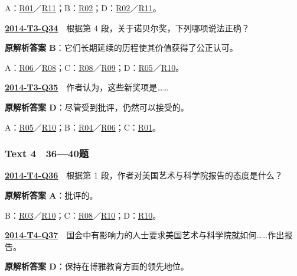 \documentclass[11pt,a4paper]{article}
\begin{document}
\noindent A：\hyperref[cat-R01]{R01}／\hyperref[cat-R11]{R11}；B：\hyperref[cat-R02]{R02}；D：\hyperref[cat-R02]{R02}／\hyperref[cat-R11]{R11}。\par\smallskip
{}\label{idx-2014-T3-Q34}\noindent\textbf{\href{https://zj139.github.io/math-notes/english/ec4f22a05d5f681f24385a88/\#q34}{2014-T3-Q34}}　根据第 4 段，关于诺贝尔奖，下列哪项说法正确？\par\nopagebreak
\noindent\textbf{原解析答案 B}：它们长期延续的历程使其价值获得了公正认可。\par\nopagebreak
\noindent A：\hyperref[cat-R06]{R06}／\hyperref[cat-R08]{R08}；C：\hyperref[cat-R08]{R08}／\hyperref[cat-R09]{R09}；D：\hyperref[cat-R05]{R05}／\hyperref[cat-R10]{R10}。\par\smallskip
{}\label{idx-2014-T3-Q35}\noindent\textbf{\href{https://zj139.github.io/math-notes/english/ec4f22a05d5f681f24385a88/\#q35}{2014-T3-Q35}}　作者认为，这些新奖项是……\par\nopagebreak
\noindent\textbf{原解析答案 D}：尽管受到批评，仍然可以接受的。\par\nopagebreak
\noindent A：\hyperref[cat-R05]{R05}／\hyperref[cat-R10]{R10}；B：\hyperref[cat-R04]{R04}／\hyperref[cat-R06]{R06}；C：\hyperref[cat-R01]{R01}。\par\smallskip
{}\subsubsection{Text 4　36—40题}
\label{idx-2014-T4-Q36}\noindent\textbf{\href{https://zj139.github.io/math-notes/english/d0543caa2ebd73b99c00cc00/\#q36}{2014-T4-Q36}}　根据第 1 段，作者对美国艺术与科学院报告的态度是什么？\par\nopagebreak
\noindent\textbf{原解析答案 A}：批评的。\par\nopagebreak
\noindent B：\hyperref[cat-R03]{R03}／\hyperref[cat-R10]{R10}；C：\hyperref[cat-R08]{R08}／\hyperref[cat-R10]{R10}；D：\hyperref[cat-R10]{R10}。\par\smallskip
{}\label{idx-2014-T4-Q37}\noindent\textbf{\href{https://zj139.github.io/math-notes/english/d0543caa2ebd73b99c00cc00/\#q37}{2014-T4-Q37}}　国会中有影响力的人士要求美国艺术与科学院就如何……作出报告。\par\nopagebreak
\noindent\textbf{原解析答案 D}：保持在博雅教育方面的领先地位。\par\nopagebreak
\end{document}
